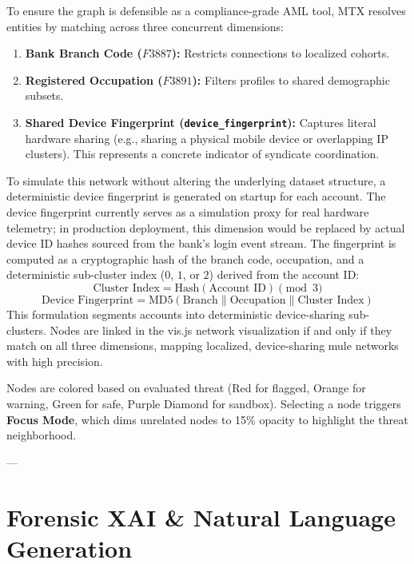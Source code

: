 \documentclass[11pt,a4paper]{article}
\begin{document}
To ensure the graph is defensible as a compliance-grade AML tool, MTX resolves entities by matching across three concurrent dimensions:
\begin{enumerate}
    \item \textbf{Bank Branch Code ($F3887$):} Restricts connections to localized cohorts.
    \item \textbf{Registered Occupation ($F3891$):} Filters profiles to shared demographic subsets.
    \item \textbf{Shared Device Fingerprint (\texttt{device\_fingerprint}):} Captures literal hardware sharing (e.g., sharing a physical mobile device or overlapping IP clusters). This represents a concrete indicator of syndicate coordination.
\end{enumerate}

To simulate this network without altering the underlying dataset structure, a deterministic device fingerprint is generated on startup for each account. The device fingerprint currently serves as a simulation proxy for real hardware telemetry; in production deployment, this dimension would be replaced by actual device ID hashes sourced from the bank's login event stream. The fingerprint is computed as a cryptographic hash of the branch code, occupation, and a deterministic sub-cluster index ($0$, $1$, or $2$) derived from the account ID:
\begin{equation}
\text{Cluster Index} = \text{Hash}(\text{Account ID}) \pmod 3
\end{equation}
\begin{equation}
\text{Device Fingerprint} = \text{MD5}(\text{Branch} \parallel \text{Occupation} \parallel \text{Cluster Index})
\end{equation}
This formulation segments accounts into deterministic device-sharing sub-clusters. Nodes are linked in the vis.js network visualization if and only if they match on all three dimensions, mapping localized, device-sharing mule networks with high precision.

Nodes are colored based on evaluated threat (Red for flagged, Orange for warning, Green for safe, Purple Diamond for sandbox). Selecting a node triggers \textbf{Focus Mode}, which dims unrelated nodes to 15\% opacity to highlight the threat neighborhood.

---

\section{Forensic XAI \& Natural Language Generation}
\end{document}
